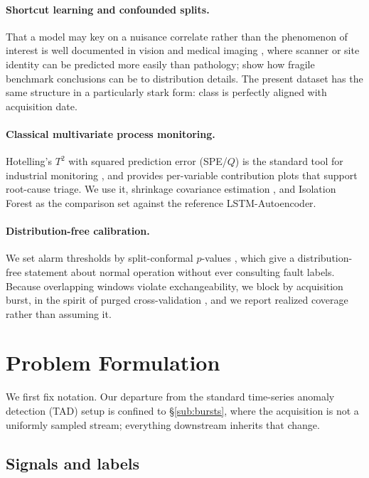 \documentclass{article}
\begin{document}
\paragraph{Shortcut learning and confounded splits.} That a model may key on a
nuisance correlate rather than the phenomenon of interest is well documented
in vision and medical imaging \citep{geirhos2020shortcut,zech2018variable},
where scanner or site identity can be predicted more easily than pathology;
\citet{recht2019imagenet} show how fragile benchmark conclusions can be to
distribution details. The present dataset has the same structure in a
particularly stark form: class is perfectly aligned with acquisition date.

\paragraph{Classical multivariate process monitoring.} Hotelling's $T^2$ with
squared prediction error (SPE/$Q$) is the standard tool for industrial
monitoring \citep{jackson1979control,qin2003statistical}, and provides
per-variable contribution plots that support root-cause triage. We use it,
shrinkage covariance estimation \citep{ledoit2004well}, and Isolation Forest
\citep{liu2008isolation} as the comparison set against the reference
LSTM-Autoencoder.

\paragraph{Distribution-free calibration.} We set alarm thresholds by
split-conformal $p$-values \citep{vovk2005algorithmic,angelopoulos2023conformal},
which give a distribution-free statement about normal operation without ever
consulting fault labels. Because overlapping windows violate exchangeability,
we block by acquisition burst, in the spirit of purged cross-validation
\citep{lopezdeprado2018advances}, and we report realized coverage rather than
assuming it.

\section{Problem Formulation}
\label{sec:prelim}

We first fix notation. Our departure from the standard time-series anomaly
detection (TAD) setup is confined to \S\ref{sub:bursts}, where the acquisition
is not a uniformly sampled stream; everything downstream inherits that change.

\subsection{Signals and labels}
\end{document}
